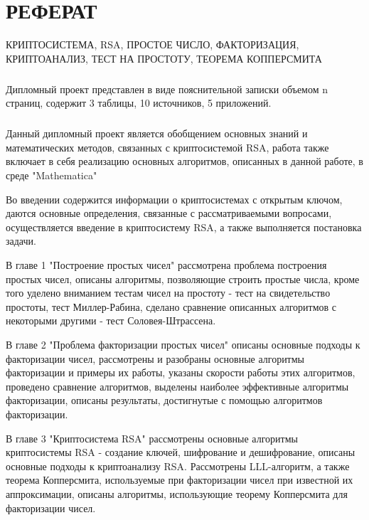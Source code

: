 
\newpage
\chapter*{РЕФЕРАТ}

КРИПТОСИСТЕМА, RSA, ПРОСТОЕ ЧИСЛО, ФАКТОРИЗАЦИЯ, КРИПТОАНАЛИЗ, ТЕСТ НА ПРОСТОТУ, ТЕОРЕМА КОППЕРСМИТА

\paragraph{} Дипломный проект представлен в виде пояснительной записки объемом n страниц, содержит 3 таблицы, 10 источников, 5 приложений.

\paragraph{} Данный дипломный проект является обобщением основных знаний и математических методов, связанных с криптосистемой RSA, работа также
	включает в себя реализацию основных алгоритмов, описанных в данной работе, в среде "Mathematica"

	Во введении содержится информации о криптосистемах с открытым ключом, даются основные определения, связанные с рассматриваемыми вопросами,
	осуществляется введение в криптосистему RSA, а также выполняется постановка задачи.

	В главе 1 "Построение простых чисел" рассмотрена проблема построения простых чисел, описаны алгоритмы, позволяющие строить простые числа, 
	кроме того уделено вниманием тестам чисел на простоту - тест на свидетельство простоты, тест Миллер-Рабина, сделано сравнение описанных алгоритмов
	с некоторыми другими - тест Соловея-Штрассена.

	В главе 2 "Проблема факторизации простых чисел" описаны основные подходы к факторизации чисел, рассмотрены и разобраны основные алгоритмы факторизации и примеры их работы, указаны скорости работы этих алгоритмов, проведено сравнение алгоритмов, выделены наиболее эффективные алгоритмы факторизации, описаны результаты, достигнутые с помощью алгоритмов факторизации.

	В главе 3 "Криптосистема RSA" рассмотрены основные алгоритмы криптосистемы RSA - создание ключей, шифрование и дешифрование, описаны основные
	подходы к криптоанализу RSA. Рассмотрены LLL-алгоритм, а также теорема Копперсмита, используемые при факторизации чисел при известной их 
	аппроксимации, описаны алгоритмы, использующие теорему Копперсмита для факторизации чисел.

\newpage

\newpage